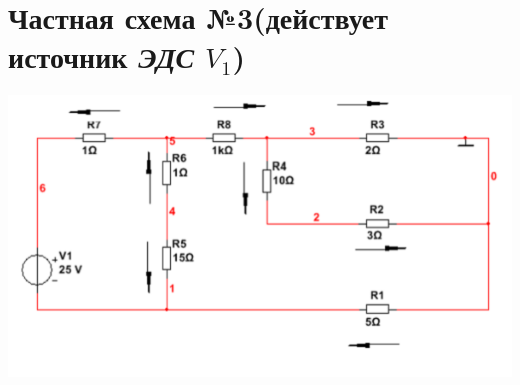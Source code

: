 \documentclass[12pt, a4paper]{report}
\begin{document}
    \section{\textbf{Частная схема №3}(действует источник \textit{ЭДС} $V_1$)}
    \begin{center}
        \includegraphics[scale = 1.1]{photo9.png}
    \end{center}

    \newpage
\end{document}
